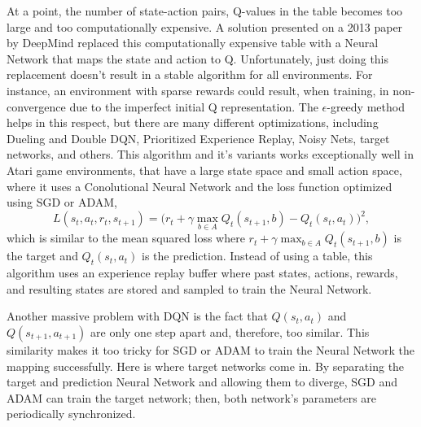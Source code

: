 At a point, the number of state-action pairs, Q-values in the table becomes too large and too computationally expensive. A solution presented on a 2013 paper by DeepMind replaced this computationally expensive table with a Neural Network that maps the state and action to Q. Unfortunately, just doing this replacement doesn't result in a stable algorithm for all environments. For instance, an environment with sparse rewards could result, when training, in non-convergence due to the imperfect initial Q representation. The $\epsilon$-greedy method helps in this respect, but there are many different optimizations, including Dueling and Double DQN, Prioritized Experience Replay, Noisy Nets, target networks, and others. This algorithm and it's variants works exceptionally well in Atari game environments, that have a large state space and small action space, where it uses a Conolutional Neural Network and the loss function optimized using SGD or ADAM, $$L(s_t, a_t, r_t, s_{t+1})=\big(r_t+\gamma\max_{b\in A} Q_t(s_{t+1},b)-Q_t(s_t,a_t)\big)^2,$$ which is similar to the mean squared loss where $r_t+\gamma\max_{b\in A} Q_t(s_{t+1},b)$ is the target and $Q_t(s_t,a_t)$ is the prediction. Instead of using a table, this algorithm uses an experience replay buffer where past states, actions, rewards, and resulting states are stored and sampled to train the Neural Network.

Another massive problem with DQN is the fact that $Q(s_t, a_t)$ and $Q(s_{t+1}, a_{t+1})$ are only one step apart and, therefore, too similar. This similarity makes it too tricky for SGD or ADAM to train the Neural Network the mapping successfully. Here is where target networks come in. By separating the target and prediction Neural Network and allowing them to diverge, SGD and ADAM can train the target network; then, both network's parameters are periodically synchronized.

